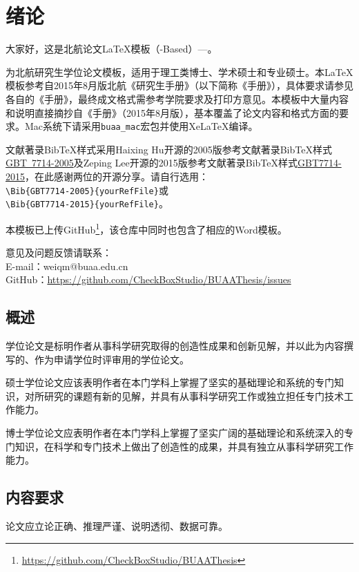 \chapter{绪论}

大家好，这是北航论文\LaTeX{}模板（\CTeX{}-Based）---\BUAAThesis{}。

\BUAAThesis{}为北航研究生学位论文模板，适用于理工类博士、学术硕士和专业硕士。本\LaTeX{}模板参考自2015年8月版北航《研究生手册》（以下简称《手册》），具体要求请参见各自的《手册》，最终成文格式需参考学院要求及打印方意见。本模板中大量内容和说明直接摘抄自《手册》（2015年8月版），基本覆盖了论文内容和格式方面的要求。Mac系统下请采用\verb|buaa_mac|宏包并使用XeLaTeX编译。

文献著录BibTeX样式采用Haixing Hu开源的2005版参考文献著录BibTeX样式\href{https://github.com/Haixing-Hu/GBT7714-2005-BibTeX-Style}{GBT~7714-2005}及Zeping Lee开源的2015版参考文献著录BibTeX样式\href{https://github.com/zepinglee/gbt7714-bibtex-style}{GBT7714-2015}，在此感谢两位的开源分享。请自行选用：\\
\verb|\Bib{GBT7714-2005}{yourRefFile}|或\\
\verb|\Bib{GBT7714-2015}{yourRefFile}|。


本模板已上传GitHub\footnote{\href{https://github.com/CheckBoxStudio/BUAAThesis}{https://github.com/CheckBoxStudio/BUAAThesis}}，该仓库中同时也包含了相应的Word模板。

意见及问题反馈请联系：\\
\indent E-mail：weiqm@buaa.edu.cn\\
\indent GitHub：\href{https://github.com/CheckBoxStudio/BUAAThesis/issues}{https://github.com/CheckBoxStudio/BUAAThesis/issues}

\section{概述}
学位论文是标明作者从事科学研究取得的创造性成果和创新见解，并以此为内容撰写的、作为申请学位时评审用的学位论文。

硕士学位论文应该表明作者在本门学科上掌握了坚实的基础理论和系统的专门知识，对所研究的课题有新的见解，并具有从事科学研究工作或独立担任专门技术工作能力。

博士学位论文应表明作者在本门学科上掌握了坚实广阔的基础理论和系统深入的专门知识，在科学和专门技术上做出了创造性的成果，并具有独立从事科学研究工作能力。

\section{内容要求}
论文应立论正确、推理严谨、说明透彻、数据可靠。

